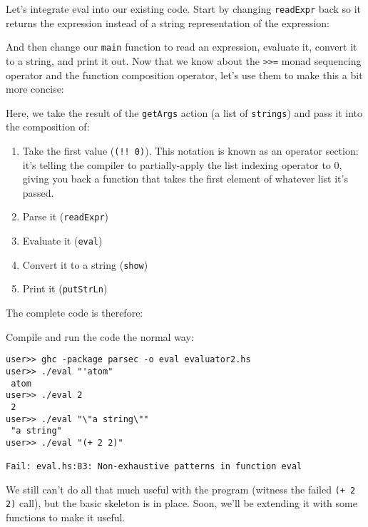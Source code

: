 Let's integrate eval into our existing code. Start by changing \verb|readExpr| back so it returns the expression instead of a string representation of the expression:
 
 
And then change our \verb|main| function to read an expression, evaluate it, convert it to a string, and print it out. Now that we know about the \lstinline|>>=| monad sequencing operator and the function composition operator, let's use them to make this a bit more concise:
 
 
Here, we take the result of the \verb|getArgs| action (a list of \verb|strings|) and pass it into the composition of:
 
\begin{enumerate}
	\item Take the first value (\lstinline|(!! 0)|). This notation is known as an operator section: it's telling the compiler to partially-apply the list indexing operator to 0, giving you back a function that takes the first element of whatever list it's passed.
	\item Parse it (\verb|readExpr|)
	\item Evaluate it (\verb|eval|)
	\item Convert it to a string (\verb|show|)
	\item Print it (\verb|putStrLn|)
\end{enumerate}
 
The complete code is therefore:
 
 
Compile and run the code the normal way:
 
\begin{lstlisting}[language=shell,numbers=none,nolol]
user>> ghc -package parsec -o eval evaluator2.hs
user>> ./eval "'atom" 
 atom
user>> ./eval 2
 2
user>> ./eval "\"a string\""
 "a string"
user>> ./eval "(+ 2 2)"
 
Fail: eval.hs:83: Non-exhaustive patterns in function eval
\end{lstlisting}
 
We still can't do all that much useful with the program (witness the failed \lstinline|(+ 2 2)| call), but the basic skeleton is in place. Soon, we'll be extending it with some functions to make it useful.
 
